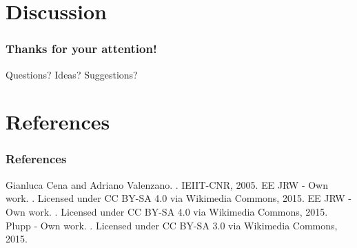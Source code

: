 \documentclass{beamer}
\begin{document}
\section*{Discussion}
\begin{frame}
	\frametitle{Thanks for your attention!}
	\huge{Questions? Ideas? Suggestions?}
\end{frame}

\section*{References}
\begin{frame}[allowframebreaks]
  \frametitle{References}    
  \begin{thebibliography}{10}    
  \beamertemplatebookbibitems
  \bibitem{[1]}
    Gianluca Cena and Adriano Valenzano.
    .
    \newblock IEIIT-CNR, 2005.
  \beamertemplatearticlebibitems
	  \bibitem{[3]}
    EE JRW - Own work.
    .
    \newblock Licensed under CC BY-SA 4.0 via Wikimedia Commons, 2015.
		\bibitem{[4]}
    EE JRW - Own work.
    .
    \newblock Licensed under CC BY-SA 4.0 via Wikimedia Commons, 2015.
	  \bibitem{[5]}
    Plupp - Own work.
    .
    \newblock Licensed under CC BY-SA 3.0 via Wikimedia Commons, 2015.		
	\end{thebibliography}
\end{frame}

\end{document}
